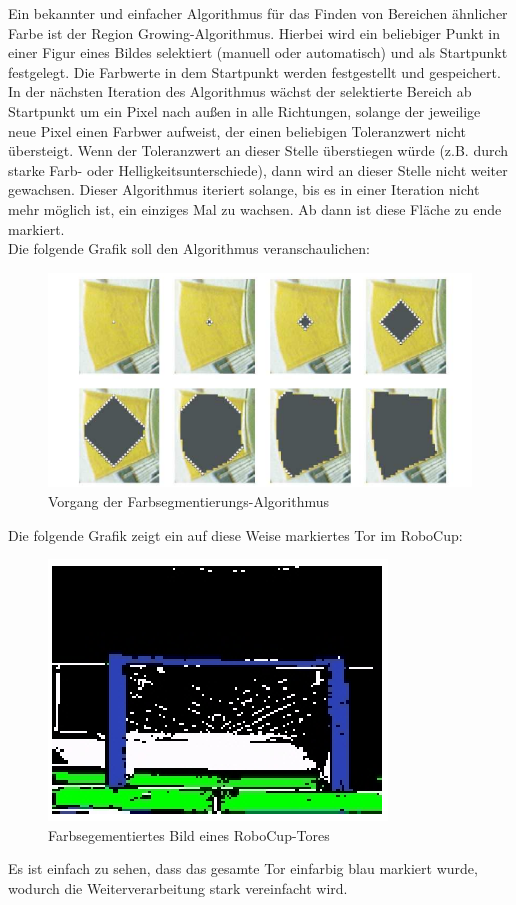 \documentclass[a4paper,12pt]{article}
\begin{document}
\newpage
Ein bekannter und einfacher Algorithmus für das Finden von Bereichen ähnlicher
Farbe ist der Region Growing-Algorithmus. Hierbei wird ein beliebiger Punkt in
einer Figur eines Bildes selektiert (manuell oder automatisch) und als Startpunkt
festgelegt. Die Farbwerte in dem Startpunkt werden festgestellt und gespeichert.
In der nächsten Iteration des Algorithmus wächst der selektierte Bereich ab 
Startpunkt um ein Pixel nach außen in alle Richtungen, solange der jeweilige 
neue Pixel einen Farbwer aufweist, der einen beliebigen Toleranzwert nicht 
übersteigt. Wenn der Toleranzwert an dieser Stelle überstiegen würde (z.B. durch
starke Farb- oder Helligkeitsunterschiede), dann wird an dieser Stelle nicht
weiter gewachsen. Dieser Algorithmus iteriert solange, bis es in einer Iteration
nicht mehr möglich ist, ein einziges Mal zu wachsen. Ab dann ist diese Fläche
zu ende markiert.
\\
Die folgende Grafik soll den Algorithmus veranschaulichen:
\begin{figure}[H]
\includegraphics[scale=0.9]{region-growing.png}
\caption{Vorgang der Farbsegmentierungs-Algorithmus}
\label{fig:color-seg-algo}
\end{figure}

\newpage
Die folgende Grafik zeigt ein auf diese Weise markiertes Tor im RoboCup:
\begin{figure}[H]
\includegraphics{segmented-view2.png}
\caption{Farbsegementiertes Bild eines RoboCup-Tores}
\label{fig:color-seg}
\end{figure}
Es ist einfach zu sehen, dass das gesamte Tor einfarbig blau markiert wurde,
wodurch die Weiterverarbeitung stark vereinfacht wird.
\end{document}
